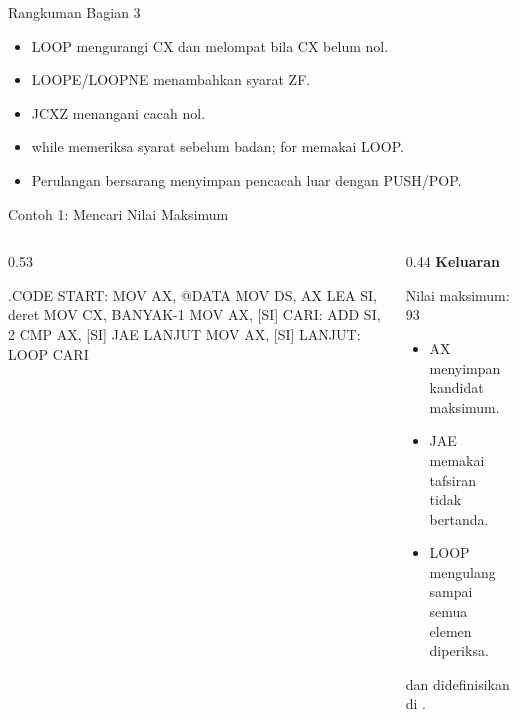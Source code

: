 \documentclass[aspectratio=169,11pt]{beamer}
\begin{document}
\begin{frame}{Rangkuman Bagian 3}
\small
\begin{itemize}
    \item LOOP mengurangi CX dan melompat bila CX belum nol.

    \vspace{0.15em}
    \item LOOPE/LOOPNE menambahkan syarat ZF.

    \vspace{0.15em}
    \item JCXZ menangani cacah nol.

    \vspace{0.15em}
    \item while memeriksa syarat sebelum badan; for memakai LOOP.

    \vspace{0.15em}
    \item Perulangan bersarang menyimpan pencacah luar dengan
          PUSH/POP.
\end{itemize}
\end{frame}

\begin{frame}[fragile]{Contoh 1: Mencari Nilai Maksimum}
\begin{columns}[t]
\begin{column}{0.53\textwidth}
\begin{kodeasm}
.CODE
START:
    MOV AX, @DATA
    MOV DS, AX
    LEA SI, deret
    MOV CX, BANYAK-1
    MOV AX, [SI]
CARI:
    ADD SI, 2
    CMP AX, [SI]
    JAE LANJUT
    MOV AX, [SI]
LANJUT:
    LOOP CARI
\end{kodeasm}
\end{column}
\begin{column}{0.44\textwidth}
\footnotesize
{\color{obeTeal}\bfseries Keluaran}\\[0.15em]
\begin{keluaran}
Nilai maksimum: 93
\end{keluaran}

\vspace{0.3em}
\begin{itemize}
    \item AX menyimpan kandidat maksimum.
    \item JAE memakai tafsiran tidak bertanda.
    \item LOOP mengulang sampai semua elemen diperiksa.
\end{itemize}

\vspace{0.2em}
{\footnotesize\color{obeGray} dan 
didefinisikan di .\par}
\end{column}
\end{columns}
\end{frame}
\end{document}
